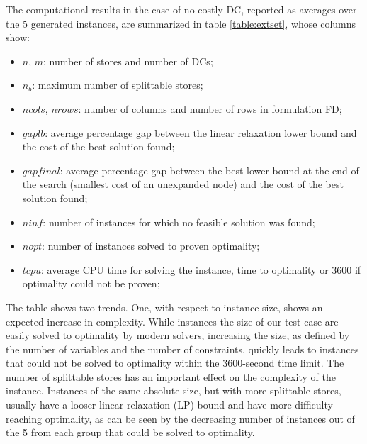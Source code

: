 \documentclass[mnsc,sglanonrev]{informs4}  %
\theoremstyle{remark}\newtheorem{remark}{Remark}
\begin{document}
\begin{APPENDICES}
The computational results in the case of no costly DC, reported as averages over the 5 generated instances, are summarized in table \ref{table:extset}, whose columns show:
\begin{itemize}
	\item $n$, $m$: number of stores and number of DCs;
	\item $n_b$: maximum number of splittable stores;
	\item $ncols$, $nrows$: number of columns and number of rows in formulation FD;
	\item $gaplb$: average percentage gap between the linear relaxation lower bound and the cost of the best solution found;
	\item $gapfinal$: average percentage gap between the best lower bound at the end of the search (smallest cost of an unexpanded node) and the cost of the best solution found;
	\item $ninf$: number of instances for which no feasible solution was found;
	\item $nopt$: number of instances solved to proven optimality;
	\item $tcpu$: average CPU time for solving the instance, time to optimality or 3600 if optimality could not be proven;
\end{itemize}

The table shows two trends. One, with respect to instance size, shows an expected increase in complexity. While instances the size of our test case are easily solved to optimality by modern solvers, increasing the size, as defined by the number of variables and the number of constraints, quickly leads to instances that could not be solved to optimality within the 3600-second time limit. 
The number of splittable stores has an important effect on the complexity of the instance. Instances of the same absolute size, but with more splittable stores, usually have a looser linear relaxation (LP) bound and have more difficulty reaching optimality, as can be seen by the decreasing number of instances out of the 5 from each group that could be solved to optimality.


\end{APPENDICES}
\end{document}
